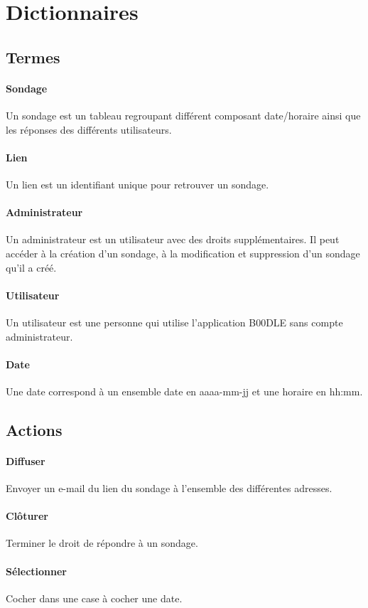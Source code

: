 \documentclass[]{report}
\begin{document}
\section{Dictionnaires}
\subsection{Termes}
\paragraph{Sondage} Un sondage est un tableau regroupant différent composant date/horaire ainsi que les réponses des différents utilisateurs.
\paragraph{Lien} Un lien est un identifiant unique pour retrouver un sondage.
\paragraph{Administrateur} Un administrateur est un utilisateur avec des droits supplémentaires. Il peut accéder à la création d’un sondage, à la modification et suppression d’un sondage qu’il a créé.
\paragraph{Utilisateur} Un utilisateur est une personne qui utilise l’application B00DLE sans compte administrateur.
\paragraph{Date} Une date correspond à un ensemble date en aaaa-mm-jj et une horaire en hh:mm.

\subsection{Actions}
\paragraph{Diffuser} Envoyer un e-mail du lien du sondage à l’ensemble des différentes adresses.
\paragraph{Clôturer} Terminer le droit de répondre à un sondage.
\paragraph{Sélectionner} Cocher dans une case à cocher une date.
\end{document}
